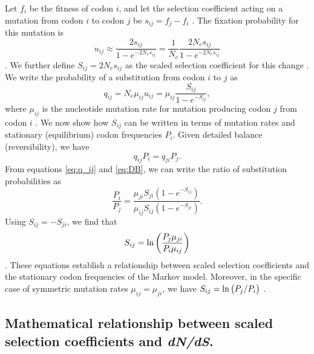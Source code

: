 \documentclass[11pt]{article}
\begin{document}
Let $f_i$ be the fitness of codon $i$, and let the selection coefficient acting on a mutation from codon $i$ to codon $j$ be $s_{ij} = f_j - f_i$ \cite{SellaHirsh2005,YangNielsen2008}. The fixation probability for this mutation is 
\begin{equation}\label{eq:u_ij}
u_{ij} \approx \frac{2s_{ij}}{1 - e^{-2N_es_{ij}}} = \frac{1}{N_e}\frac{2N_es_{ij}}{1 - e^{-2N_es_{ij}}}
\end{equation} \cite{Kimura1962,HalpernBruno1998,YangNielsen2008}. We further define $S_{ij} = 2N_es_{ij}$ as the scaled selection coefficient for this change \cite{YangNielsen2008}. We write the probability of a substitution from codon $i$ to $j$ as
\begin{equation}\label{eq:q_ij}
q_{ij} = N_e\mu_{ij}u_{ij} = \mu_{ij}\frac{S_{ij}}{1 - e^{-S_{ij}}} , 
\end{equation} where $\mu_{ij}$ is the nucleotide mutation rate for mutation producing codon $j$ from codon $i$ \cite{HalpernBruno1998,SellaHirsh2005}.
We now show how $S_{ij}$ can be written in terms of mutation rates and stationary (equilibrium) codon frequencies $P_i$. Given detailed balance (reversibility), we have 
\begin{equation}\label{eq:DB}
q_{ij}P_i = q_{ji}P_j .
\end{equation} From equations \eqref{eq:q_ij} and \eqref{eq:DB}, we can write the ratio of substitution probabilities as 
\begin{equation}\label{ratio_q_ij}
\frac{P_i}{P_j} = \frac{\mu_{ji} S_{ji} (1-e^{-S_{ij}})} {\mu_{ij} S_{ij} (1-e^{-S_{ji}})} .
\end{equation} Using $S_{ij} = -S_{ji}$, we find that
\begin{equation}\label{eq:s_pmu}
S_{ij} = \ln\bigg{(} \frac{P_j\mu_{ji}}{P_i\mu_{ij}} \bigg{)} 
\end{equation} \cite{HalpernBruno1998}. These equations establish a relationship between scaled selection coefficients and the stationary codon frequencies of the Markov model. Moreover, in the specific case of symmetric mutation rates $\mu_{ij} = \mu_{ji}$, we have $S_{ij} = \ln\big{(}P_j/P_i\big{)}$ \cite{SellaHirsh2005}. 


		
\subsection*{Mathematical relationship between scaled selection coefficients and \emph{dN/dS}.} 
\end{document}
